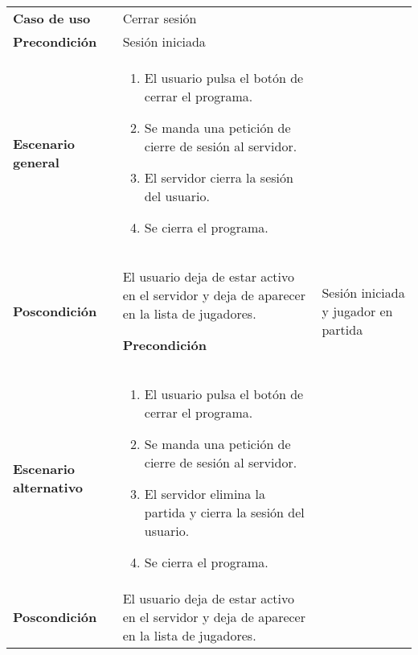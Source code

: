 {\footnotesize
\begin{tabularx}{0.95\textwidth}{p{}|X}

\textbf{Caso de uso} & Cerrar sesión \\

\textbf{Precondición} & Sesión iniciada \\

\textbf{Escenario general} & \begin{enumerate}
\item El usuario pulsa el botón de cerrar el programa.
\item Se manda una petición de cierre de sesión al servidor.
\item El servidor cierra la sesión del usuario.
\item Se cierra el programa.
\end{enumerate} \\

\textbf{Poscondición} & El usuario deja de estar activo en el servidor y deja de aparecer
en la lista de jugadores.

\textbf{Precondición} & Sesión iniciada y jugador en partida \\

\textbf{Escenario alternativo} & \begin{enumerate}
\item El usuario pulsa el botón de cerrar el programa.
\item Se manda una petición de cierre de sesión al servidor.
\item El servidor elimina la partida y cierra la sesión del usuario.
\item Se cierra el programa.
\end{enumerate} \\

\textbf{Poscondición} & El usuario deja de estar activo en el servidor y deja de aparecer
en la lista de jugadores.

\end{tabularx}
}

